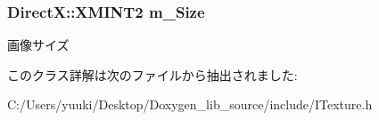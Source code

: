 \subsubsection[{\texorpdfstring{m\+\_\+\+Size}{m_Size}}]{\setlength{\rightskip}{0pt plus 5cm}Direct\+X\+::\+X\+M\+I\+N\+T2 m\+\_\+\+Size\hspace{0.3cm}{\ttfamily [protected]}}\hypertarget{class_a_p_i_1_1abstract_adb6dc678fde02000203c71a186713543}{}\label{class_a_p_i_1_1abstract_adb6dc678fde02000203c71a186713543}
画像サイズ 

このクラス詳解は次のファイルから抽出されました\+:\begin{DoxyCompactItemize}
\item 
C\+:/\+Users/yuuki/\+Desktop/\+Doxygen\+\_\+lib\+\_\+source/include/I\+Texture.\+h\end{DoxyCompactItemize}

